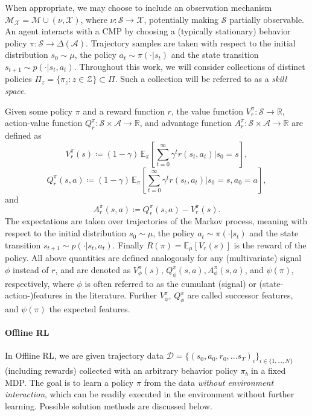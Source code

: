 \documentclass{article}
\theoremstyle{plain}
\theoremstyle{definition}
\theoremstyle{remark}
\newcommand{\sS}{\mathcal{S}}
\newcommand{\sA}{\mathcal{A}}
\newcommand{\dist}[1]{\Delta({#1})}
\begin{document}
When appropriate, we may choose to include an observation mechanism $\mathcal{M}_\mathcal{X} = \mathcal{M} \cup (\nu, \mathcal{X})$, where $\nu: \sS\to\mathcal{X}$, potentially making $\sS$ partially observable.
An agent interacts with a CMP by choosing a (typically stationary) behavior policy $\pi:\sS\to\dist\sA$. 
Trajectory samples are taken with respect to the initial distribution $s_0\sim\mu$, the policy $a_{t}\sim\pi(\cdot|s_t)$ and the state transition $s_{t+1} \sim p(\cdot|s_t, a_t)$. 
Throughout this work, we will consider collections of distinct policies $\Pi_z = \{\pi_z: z\in \mathcal{Z}\}\subset\Pi$. 
Such a collection will be referred to as a \emph{skill space}.

Given some policy $\pi$ and a reward function $r$, the value function $V_r^\pi\colon \sS \to \mathbb{R}$, action-value function $Q_r^\pi\colon \sS\times\sA \to \mathbb{R}$, and advantage function $A_r^\pi\colon \sS \times \sA \to \mathbb{R}$ are defined as
\begin{equation*}
    V_r^\pi(s) \coloneqq (1-\gamma)\,\mathbb{E}_\pi \left[ \sum_{t=0}^{\infty} \gamma^t r(s_t, a_t) \Big|  s_0 = s \right],    
\end{equation*}
\begin{equation*}
    Q_r^\pi(s, a) \coloneqq (1-\gamma)\,\mathbb{E}_\pi \left[ \sum_{t=0}^{\infty} \gamma^t r(s_t, a_t) \Big| s_0 = s, a_0 = a \right],
\end{equation*}
and
\begin{equation*}
A_r^\pi(s,a) \coloneqq Q_r^\pi(s, a) - V_r^\pi(s).
\end{equation*}
The expectations are taken over trajectories of the Markov process, meaning with respect to the initial distribution $s_0\sim\mu$, the policy $a_{t}\sim\pi(\cdot|s_t)$ and the state transition $s_{t+1} \sim p(\cdot|s_t, a_t)$. Finally $R(\pi) = \mathbb{E}_\mu[V_r(s)]$ is the reward of the policy. All above quantities are defined analogously for any (multivariate) signal $\phi$ instead of $r$, and are denoted as $V_{\phi}^\pi(s)$, $Q_{\phi}^\pi(s,a), A_{\phi}^\pi(s,a)$, and $\psi(\pi)$, respectively, where $\phi$ is often referred to as the cumulant (signal) or (state-action-)features in the literature. Further $V_{\phi}^\pi$, $Q_{\phi}^\pi$ are called successor features, and $\psi(\pi)$ the expected features.

\paragraph{Offline RL} In Offline RL, we are given trajectory data $\mathcal{D} = \{(s_0,a_0,r_0, ...s_T)_i\}_{i\in\{1,...,N\}}$ (including rewards) collected with an arbitrary behavior policy $\pi_b$ in a fixed MDP. The goal is to learn a policy $\pi$ from the data \textit{without environment interaction}, which can be readily executed in the environment without further learning. Possible solution methods are discussed below.
\end{document}
